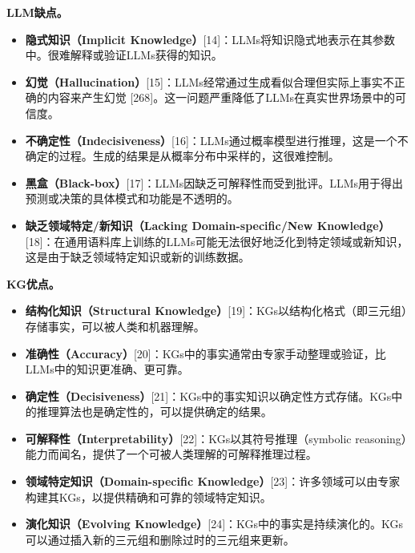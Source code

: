 \textbf{LLM缺点。}

\begin{itemize}
\item \textbf{隐式知识（Implicit Knowledge）}[14]：LLMs将知识隐式地表示在其参数中。很难解释或验证LLMs获得的知识。

\item \textbf{幻觉（Hallucination）}[15]：LLMs经常通过生成看似合理但实际上事实不正确的内容来产生幻觉 [268]。这一问题严重降低了LLMs在真实世界场景中的可信度。

\item \textbf{不确定性（Indecisiveness）}[16]：LLMs通过概率模型进行推理，这是一个不确定的过程。生成的结果是从概率分布中采样的，这很难控制。

\item \textbf{黑盒（Black-box）}[17]：LLMs因缺乏可解释性而受到批评。LLMs用于得出预测或决策的具体模式和功能是不透明的。

\item \textbf{缺乏领域特定/新知识（Lacking Domain-specific/New Knowledge）}[18]：在通用语料库上训练的LLMs可能无法很好地泛化到特定领域或新知识，这是由于缺乏领域特定知识或新的训练数据。
\end{itemize}

\textbf{KG优点。}

\begin{itemize}
\item \textbf{结构化知识（Structural Knowledge）}[19]：KGs以结构化格式（即三元组）存储事实，可以被人类和机器理解。

\item \textbf{准确性（Accuracy）}[20]：KGs中的事实通常由专家手动整理或验证，比LLMs中的知识更准确、更可靠。

\item \textbf{确定性（Decisiveness）}[21]：KGs中的事实知识以确定性方式存储。KGs中的推理算法也是确定性的，可以提供确定的结果。

\item \textbf{可解释性（Interpretability）}[22]：KGs以其符号推理（symbolic reasoning）能力而闻名，提供了一个可被人类理解的可解释推理过程。

\item \textbf{领域特定知识（Domain-specific Knowledge）}[23]：许多领域可以由专家构建其KGs，以提供精确和可靠的领域特定知识。

\item \textbf{演化知识（Evolving Knowledge）}[24]：KGs中的事实是持续演化的。KGs可以通过插入新的三元组和删除过时的三元组来更新。
\end{itemize}

